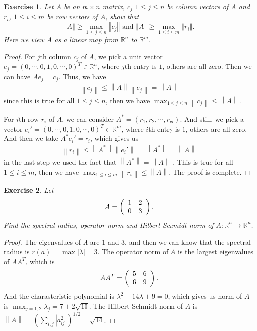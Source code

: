 \documentclass[11pt]{book}
\newtheorem{exercise}{Exercise}[section]
\theoremstyle{definition}
\numberwithin{equation}{subsection}
\begin{document}
\begin{exercise}
Let $A$ be an $m\times n$ matrix, $c_{j}$ $1\leq j\leq n$ be column
vectors of $A$ and $r_{i}$, $1\leq i\leq m$ be row vectors of $A$, show that%
$$
\left\Vert A\right\Vert \geq\max_{1\leq j\leq n}\left\Vert c_{j}\right\Vert
\text{ and }\left\Vert A\right\Vert \geq\max_{1\leq i\leq m}\left\Vert
r_{i}\right\Vert .
$$
Here we view $A$ as a linear map from $\mathbb{R}^{n}$ to $\mathbb{R}^{m}$.
\end{exercise}
\begin{proof}
For $j$th column $c_j$ of $A$, we pick a unit vector $e_j = (0,\cdots, 0,1,0,\cdots,0)^T \in \mathbb{R}^n$, where $j$th entry is $1$, others are all zero. Then we can have $Ae_j = c_j$. Thus, we have 
\begin{align*}
    \left\|c_j \right\| \leq \left\|A \right\| \left\|e_j  \right\| = \left\|A \right\|
\end{align*}
since this is true for all $1\leq j \leq n$, then we have $\max_{1\leq j \leq n}\left\|c_j \right\| \leq \left\|A \right\|$. 

For $i$th row $r_i$ of $A$, we can consider $A^* = (r_1, r_2,\cdots, r_m)$. And still, we pick a vector $e_i' = (0,\cdots, 0,1,0,\cdots,0)^T \in \mathbb{R}^m$, where $i$th entry is $1$, others are all zero. And then we take $A^* e_i' = r_i$, which gives us 
\begin{align*}
    \left\|r_i \right\| \leq \left\|A^* \right\| \left\|e_i'  \right\| = \left\|A^* \right\| = \left\|A \right\|
\end{align*}
in the last step we used the fact that $\left\|A^* \right\| = \left\|A \right\|$ . This is true for all $1\leq i \leq m$, then we have $\max_{1\leq i \leq m}\left\|r_i \right\| \leq \left\|A \right\|$. The proof is complete.
\end{proof}

\medskip

\begin{exercise}
Let
$$
A=\left(
\begin{array}
[c]{cc}%
1 & 2\\
0 & 3
\end{array}
\right)  .
$$
Find the spectral radius, operator norm and Hilbert-Schmidt norm of
$A:\mathbb{R}^{n}\rightarrow\mathbb{R}^{n}$.
\end{exercise}
\begin{proof}
The eigenvalues of $A$ are $1$ and $3$, and then we can know that the spectral radius is $r(a) = \max |\lambda| = 3$. The operator norm of $A$ is  the largest eigenvalues of $AA^T$, which is 
$$
AA^T=\left(
\begin{array}
[c]{cc}%
5 & 6\\
6 & 9
\end{array}
\right).
$$
And the charasteristic polynomial is $\lambda^2 - 14\lambda + 9 = 0$, which gives us norm of $A$ is $\max_{j=1,2} \lambda_j = 7+2\sqrt{10}$. The Hilbert-Schmidt norm of $A$ is $\left\| A\right\| = \left(\sum_{i,j}|a_{ij}^2| \right)^{1/2} = \sqrt{14}$.
\end{proof}
\end{document}
